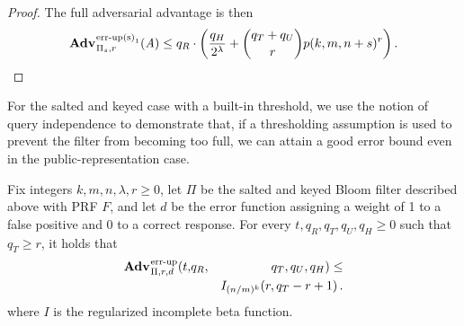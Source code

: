 \begin{proof}
The full adversarial advantage is then
$$\Adv{\erreps_1}_{\struct_s,r}(\advA) \le q_R \cdot \left(\frac{q_H}{2^\lambda} + \binom{q_T+q_U}{r}p(k, m, n+s)^r\right).$$

\missingqed
\end{proof}




For the salted and keyed case with a built-in threshold, we use the notion of query independence to demonstrate that, if a thresholding assumption is used to prevent the filter from becoming too full, we can attain a good error bound even in the public-representation case.

\begin{theorem}\label{thm:bf-key-bound}
Fix integers $k, m, n, \lambda, r\geq 0$, let $\Pi$ be the salted and keyed Bloom filter described above with PRF $F$, and let $d$ be the error function assigning a weight of 1 to a false positive and 0 to a correct response.
  For every $t, q_R, q_T, q_U, q_H \geq 0$ such that $q_T \geq r$, it holds that
  \begin{eqnarray*}
    \Adv{\errep}_{\struct,r,d}(t,&q_R,& q_T, q_U, q_H) \leq \\ && I_{(n/m)^k}(r, q_T-r+1) \,.
  \end{eqnarray*}
where $I$ is the regularized incomplete beta function.
\end{theorem}

